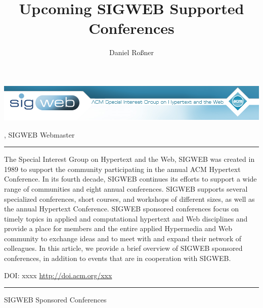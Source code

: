 \documentclass{scrartcl}
\title{Upcoming SIGWEB Supported Conferences}
\author{Daniel Roßner}
\begin{document}
\begin{titlepage}
\label{first}
\begin{center}
    \includegraphics[width=\textwidth]{sigweb-banner.png}
\end{center}

\vspace*{1em}

    {\LARGE\textbf{\MakeUppercase\thetitle}\hfill}

    \vspace*{.5em}

    \hfill\theauthor, SIGWEB Webmaster

    \par\noindent\rule{\textwidth}{0.2pt}

    \vspace*{.5em}

    \noindent The Special Interest Group on Hypertext and the Web, SIGWEB was created in 1989 to support the community participating in the annual ACM Hypertext Conference. In its fourth decade, SIGWEB continues its efforts to support a wide range of communities and eight annual conferences. SIGWEB supports several specialized conferences, short courses, and workshops of different sizes, as well as the annual Hypertext Conference. SIGWEB sponsored conferences focus on timely topics in applied and computational hypertext and Web disciplines and provide a place for members and the entire applied Hypermedia and Web community to exchange ideas and to meet with and expand their network of colleagues. In this article, we provide a brief overview of SIGWEB sponsored conferences, in addition to events that are in cooperation with SIGWEB.

    \vspace*{1em}

    DOI: xxxx \hfill \url{http://doi.acm.org/xxx}

    \par\noindent\rule{\textwidth}{0.2pt}

    \vspace*{.5em}

    \noindent SIGWEB Sponsored Conferences


\end{titlepage}
\end{document}
